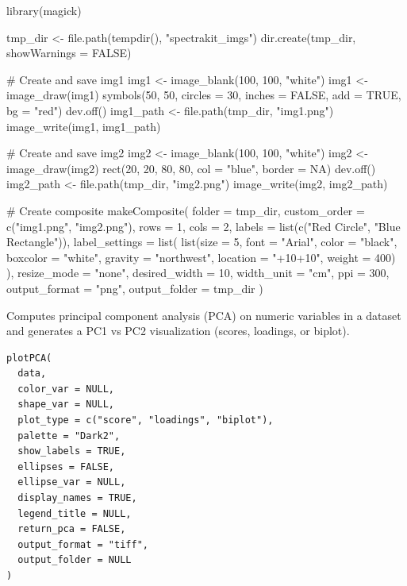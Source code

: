 \documentclass[a4paper]{book}
\begin{document}
\begin{Examples}
\begin{ExampleCode}
library(magick)

tmp_dir <- file.path(tempdir(), "spectrakit_imgs")
dir.create(tmp_dir, showWarnings = FALSE)

# Create and save img1
img1 <- image_blank(100, 100, "white")
img1 <- image_draw(img1)
symbols(50, 50, circles = 30, inches = FALSE, add = TRUE, bg = "red")
dev.off()
img1_path <- file.path(tmp_dir, "img1.png")
image_write(img1, img1_path)

# Create and save img2
img2 <- image_blank(100, 100, "white")
img2 <- image_draw(img2)
rect(20, 20, 80, 80, col = "blue", border = NA)
dev.off()
img2_path <- file.path(tmp_dir, "img2.png")
image_write(img2, img2_path)

# Create composite
makeComposite(
        folder = tmp_dir,
        custom_order = c("img1.png", "img2.png"),
        rows = 1,
        cols = 2,
        labels = list(c("Red Circle", "Blue Rectangle")),
        label_settings = list(
                list(size = 5, font = "Arial", color = "black", boxcolor = "white",
                     gravity = "northwest", location = "+10+10", weight = 400)
        ),
        resize_mode = "none",
        desired_width = 10,
        width_unit = "cm",
        ppi = 300,
        output_format = "png",
        output_folder = tmp_dir
)

\end{ExampleCode}
\end{Examples}
%
\begin{Description}
Computes principal component analysis (PCA) on numeric variables in a dataset
and generates a PC1 vs PC2 visualization (scores, loadings, or biplot).
\end{Description}
%
\begin{Usage}
\begin{verbatim}
plotPCA(
  data,
  color_var = NULL,
  shape_var = NULL,
  plot_type = c("score", "loadings", "biplot"),
  palette = "Dark2",
  show_labels = TRUE,
  ellipses = FALSE,
  ellipse_var = NULL,
  display_names = TRUE,
  legend_title = NULL,
  return_pca = FALSE,
  output_format = "tiff",
  output_folder = NULL
)
\end{verbatim}
\end{Usage}
%
\end{document}
